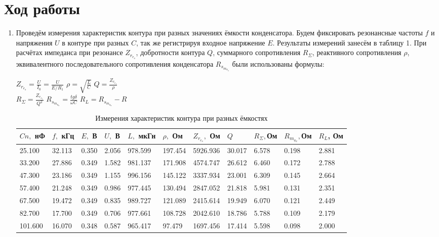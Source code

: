 \documentclass[a4paper]{article}
\begin{document}
\section{Ход работы}
\begin{enumerate}
    \item Проведём измерения характеристик контура при разных значениях ёмкости конденсатора. Будем фиксировать резонансные частоты $f$ и напряжения $U$ в контуре при разных $C$, так же регистрируя входное напряжение $E$. Результаты измерений занесём в таблицу 1. При расчётах импеданса при резонансе $Z_r_e_s$, добротности контура $Q$, суммарного сопротивления $R_{\Sigma}$, реактивного сопротивления $\rho$, эквивалентного последовательного сопротивления конденсатора $R_s_m_a_x$ были использованы формулы:
    
\begin{center}
    $Z_r_e_s = \frac{U}{I_0} = \frac{U}{E/R_1}$ \hspace{1cm} $\rho = \sqrt{\frac{L}{C}}$\hspace{1cm} $Q = \frac{Z_r_e_s}{\rho}$ \\
    $R_{\Sigma} = \frac{Z_r_e_s}{Q^2}$ \hspace{1cm} $R_s_m_a_x = \frac{tg\delta}{\omega C}$ \hspace{1cm} $R_L = R_s_m_a_x - R$
    
\end{center}
    
    \begin{table}[h]
    \centering
    \begin{center}
    \caption{Измерения характеристик контура при разных ёмкостях}
    \end{center}
    \vspace{0.1cm}
    \label{tab:my_label}
    \begin{tabular}{ |p{1.2cm}|p{1.2cm}|p{0.9cm}|p{0.9cm}|p{1.3cm}|p{1.2cm}|p{1.5cm}|p{1.2cm}|p{1.2cm}|p{1.3cm}|p{1.2cm}| }
 \hline
$Cn,$ нФ & $f,$ кГц & $E,$ В & $U,$ В & $L,$ мкГн & $\rho,$ Ом & $Z_r_e_s,$ Ом & $Q$ & $R_{\Sigma}, $Ом & $R_m_a_x, $Ом & $R_L$, Ом\\
 \hline
25.100 & 32.113 & 0.350 & 2.056 & 978.599 & 197.454 & 5926.936 & 30.017 & 6.578 & 0.198 & 2.881\\
 \hline
33.200 & 27.886 & 0.349 & 1.582 & 981.137 & 171.908 & 4574.747 & 26.612 & 6.460 & 0.172 & 2.788\\
 \hline
47.300 & 23.186 & 0.349 & 1.155 & 996.156 & 145.122 & 3337.934 & 23.001 & 6.309 & 0.145 & 2.664\\
 \hline
57.400 & 21.248 & 0.349 & 0.986 & 977.445 & 130.494 & 2847.052 & 21.818 & 5.981 & 0.131 & 2.351\\
 \hline
67.500 & 19.472 & 0.349 & 0.835 & 989.727 & 121.089 & 2415.614 & 19.949 & 6.070 & 0.121 & 2.449\\
 \hline
82.700 & 17.700 & 0.349 & 0.706 & 977.661 & 108.728 & 2042.610 & 18.786 & 5.788 & 0.109 & 2.179\\
 \hline
101.600 & 16.070 & 0.348 & 0.587 & 965.417 & 97.479 & 1697.456 & 17.414 & 5.598 & 0.098 & 2.000\\
\hline
\hline
    


\end{tabular}
\end{table}
\end{enumerate}
\end{document}
